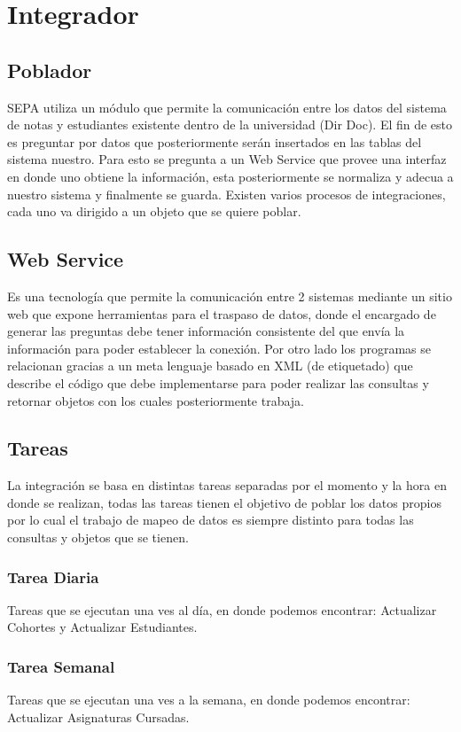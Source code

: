 \documentclass[a4paper,12pt,openany,oneside]{book}
\begin{document}
\chapter{Integrador}
\thispagestyle{empty}
\section{Poblador}
SEPA utiliza un módulo que permite la comunicación entre los datos del sistema de notas y estudiantes existente dentro de la universidad (Dir Doc). El fin de esto es preguntar por datos que posteriormente serán insertados en las tablas del sistema nuestro. Para esto se pregunta a un Web Service que provee una interfaz en donde uno obtiene la información, esta posteriormente se normaliza y adecua a nuestro sistema y finalmente se guarda. Existen varios procesos de integraciones, cada uno va dirigido a un objeto que se quiere poblar.
\section{Web Service}
Es una tecnología que permite la comunicación entre 2 sistemas mediante un sitio web que expone herramientas para el traspaso de datos, donde el encargado de generar las preguntas debe tener información consistente del que envía la información para poder establecer la conexión. Por otro lado los programas se relacionan gracias a un meta lenguaje basado en XML (de etiquetado) que describe el código que debe implementarse para poder realizar las consultas y retornar objetos con los cuales posteriormente trabaja.
\section{Tareas}
La integración se basa en distintas tareas separadas por el momento y la hora en donde se realizan, todas las tareas tienen el objetivo de poblar los datos propios por lo cual el trabajo de mapeo de datos es siempre distinto para todas las consultas y objetos que se tienen.
\subsection{Tarea Diaria}
Tareas que se ejecutan una ves al día, en donde podemos encontrar: Actualizar Cohortes y Actualizar Estudiantes.
\subsection{Tarea Semanal}
Tareas que se ejecutan una ves a la semana, en donde podemos encontrar: Actualizar Asignaturas Cursadas.
\end{document}
